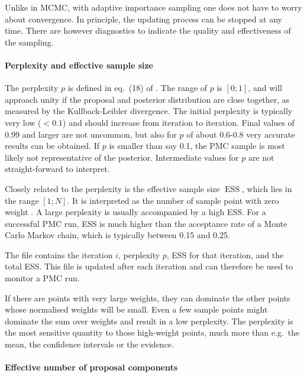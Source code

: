 \documentclass[11pt, chapterprefix, headsepline]{scrartcl}
\begin{document}
Unlike in MCMC, with adaptive importance sampling one does not have to
worry about convergence. In principle, the updating process can be
stopped at any time. There are however diagnostics to indicate the quality and
effectiveness of the sampling.


\paragraph{Perplexity and effective sample size} \quad {}

The perplexity $p$ is defined in eq.~(18) of \cite{WK09}.
The range of $p$ is $[0;1]$, and will approach unity if
the proposal and posterior distribution are close together, as
measured by the Kullback-Leibler divergence. The initial perplexity is
typically very low ($<0.1$) and should increase from iteration to
iteration. Final values of 0.99 and larger are not uncommon, but also
for $p$ of about 0.6-0.8 very accurate results can be obtained. If $p$
is smaller than say 0.1, the PMC sample is most likely not
representative of the posterior. Intermediate values for $p$ are not
straight-forward to interpret.

Closely related to the perplexity is the effective sample size
$\operatorname{ESS}$, which lies in the range $[1;N]$. It is interpreted
as the number of sample point with zero weight
\citep{liu:chen:1995}. A large perplexity is usually accompanied by a
high ESS. For a successful PMC run, ESS is much higher than
the acceptance rate of a Monte Carlo Markov chain, which is typically between
0.15 and 0.25.

The file  contains the iteration $i$, perplexity
$p$, ESS for that iteration, and the total ESS. This file is updated
after each iteration and can therefore be used to monitor a PMC run.

If there are points with very large weights, they can dominate the
other points whose normalised weights will be small. Even a few sample
points might dominate the sum over weights and result in a low
perplexity. The perplexity is the most sensitive quantity to those
high-weight points, much more than e.g.~the mean, the confidence
intervals or the evidence.


\paragraph{Effective number of proposal components} \quad {}
\label{sec:prop_comp}
\end{document}
